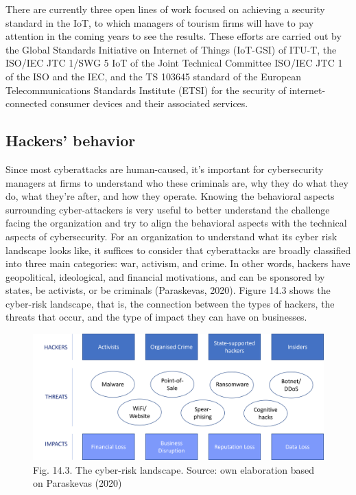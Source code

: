 \documentclass[
  letterpaper,
  DIV=11,
  numbers=noendperiod]{scrreprt}
\begin{document}
There are currently three open lines of work focused on achieving a
security standard in the IoT, to which managers of tourism firms will
have to pay attention in the coming years to see the results. These
efforts are carried out by the Global Standards Initiative on Internet
of Things (IoT-GSI) of ITU-T, the ISO/IEC JTC 1/SWG 5 IoT of the Joint
Technical Committee ISO/IEC JTC 1 of the ISO and the IEC, and the TS
103645 standard of the European Telecommunications Standards Institute
(ETSI) for the security of internet-connected consumer devices and their
associated services.

\hypertarget{hackers-behavior}{%
\subsection{Hackers' behavior}\label{hackers-behavior}}

Since most cyberattacks are human-caused, it's important for
cybersecurity managers at firms to understand who these criminals are,
why they do what they do, what they're after, and how they operate.
Knowing the behavioral aspects surrounding cyber-attackers is very
useful to better understand the challenge facing the organization and
try to align the behavioral aspects with the technical aspects of
cybersecurity. For an organization to understand what its cyber risk
landscape looks like, it suffices to consider that cyberattacks are
broadly classified into three main categories: war, activism, and crime.
In other words, hackers have geopolitical, ideological, and financial
motivations, and can be sponsored by states, be activists, or be
criminals (Paraskevas, 2020). Figure 14.3 shows the cyber-risk
landscape, that is, the connection between the types of hackers, the
threats that occur, and the type of impact they can have on businesses.

\begin{figure}

{\centering \includegraphics{img/fig23.png}

}

\caption{Fig. 14.3. The cyber-risk landscape. Source: own elaboration
based on Paraskevas (2020)}

\end{figure}
\end{document}
